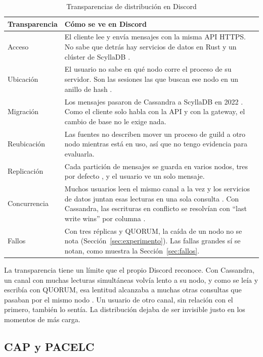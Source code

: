 \documentclass[11pt,a4paper]{article}
\begin{document}
\begin{table}[H]
  \centering
  \small
  \caption{Transparencias de distribución en Discord}
  \label{tab:transparencias}
  \begin{tabularx}{\textwidth}{@{}p{2.6cm}X@{}}
    \toprule
    \textbf{Transparencia} & \textbf{Cómo se ve en Discord} \\
    \midrule
    Acceso & El cliente lee y envía mensajes con la misma API HTTPS. No sabe que detrás hay servicios de datos en Rust y un clúster de ScyllaDB \cite{Ingram2023}. \\
    Ubicación & El usuario no sabe en qué nodo corre el proceso de su servidor. Son las sesiones las que buscan ese nodo en un anillo de hash \cite{Vishnevskiy2017elixir}. \\
    Migración & Los mensajes pasaron de Cassandra a ScyllaDB en 2022 \cite{Ingram2023}. Como el cliente solo habla con la API y con la gateway, el cambio de base no le exige nada. \\
    Reubicación & Las fuentes no describen mover un proceso de guild a otro nodo mientras está en uso, así que no tengo evidencia para evaluarla. \\
    Replicación & Cada partición de mensajes se guarda en varios nodos, tres por defecto \cite{Ingram2023}, y el usuario ve un solo mensaje. \\
    Concurrencia & Muchos usuarios leen el mismo canal a la vez y los servicios de datos juntan esas lecturas en una sola consulta \cite{Ingram2023}. Con Cassandra, las escrituras en conflicto se resolvían con \enquote{last write wins} por columna \cite{Vishnevskiy2017billions}. \\
    Fallos & Con tres réplicas y QUORUM, la caída de un nodo no se nota (Sección~\ref{sec:experimento}). Las fallas grandes sí se notan, como muestra la Sección~\ref{sec:fallos}. \\
    \bottomrule
  \end{tabularx}
\end{table}

La transparencia tiene un límite que el propio Discord reconoce. Con Cassandra, un canal con muchas lecturas simultáneas volvía lento a su nodo, y como se leía y escribía con QUORUM, esa lentitud alcanzaba a muchas otras consultas que pasaban por el mismo nodo \cite{Ingram2023}. Un usuario de otro canal, sin relación con el primero, también lo sentía. La distribución dejaba de ser invisible justo en los momentos de más carga.

\subsection{CAP y PACELC}\label{sec:cap}
\end{document}
